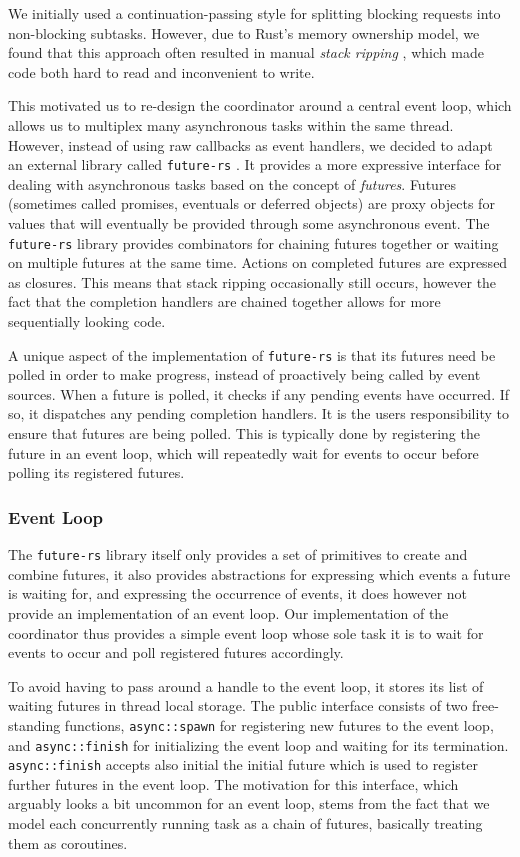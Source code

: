 We initially used a continuation-passing style for splitting blocking requests into
non-blocking subtasks. However, due to Rust's memory ownership model, we found that
this approach often resulted in manual \emph{stack ripping} \cite{stackmgmt},
which made code both hard to read and inconvenient to write.

This motivated us to re-design the coordinator around a central event loop, which
allows us to multiplex many asynchronous tasks within the same thread. However,
instead of using raw callbacks as event handlers, we decided to adapt an external
library called \lstinline{future-rs} \cite{futuresrs}. It provides a more expressive interface
for dealing with asynchronous tasks based on the concept of \emph{futures}. Futures
(sometimes called promises, eventuals or deferred objects) are proxy objects for
values that will eventually be provided through some asynchronous event.
The \lstinline{future-rs} library provides combinators for chaining futures
together or waiting on multiple futures at the same time. Actions on completed
futures are expressed as closures. This means that stack ripping occasionally
still occurs, however the fact that the completion handlers are chained together
allows for more sequentially looking code.

A unique aspect of the implementation of \lstinline{future-rs} is that its futures
need be polled in order to make progress, instead of proactively being called
by event sources. When a future is polled, it checks if any pending events
have occurred. If so, it dispatches any pending completion handlers. 
It is the users responsibility to ensure that futures are being
polled. This is typically done by registering the future in an event loop,
which will repeatedly wait for events to occur before polling its registered
futures.

\subsubsection{Event Loop}
The \lstinline{future-rs} library itself only provides a set of primitives to
create and combine futures, it also provides abstractions for expressing which
events a future is waiting for, and expressing the occurrence of events, it
does however not provide an implementation of an event loop. Our implementation
of the coordinator thus provides a simple event loop whose sole task it is
to wait for events to occur and poll registered futures accordingly.

To avoid having to pass around a handle to the event loop, it stores its 
list of waiting futures in thread local storage. The public interface consists 
of two free-standing functions, \lstinline{async::spawn} for registering
new futures to the event loop, and \lstinline{async::finish} for initializing
the event loop and waiting for its termination. \lstinline{async::finish} accepts
also initial the initial future which is used to register further futures in
the event loop. The motivation for this interface, which arguably looks
a bit uncommon for an event loop, stems from the fact that we model each
concurrently running task as a chain of futures, basically treating them as
coroutines.  

